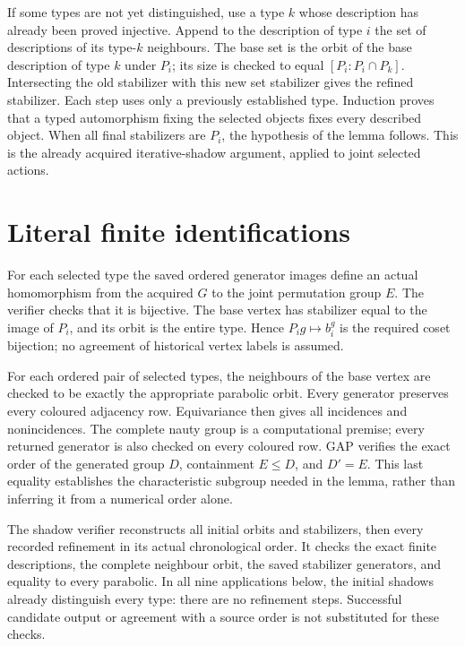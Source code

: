 \documentclass[11pt]{article}
\begin{document}
If some types are not yet distinguished, use a type $k$ whose
description has already been proved injective. Append to the description
of type $i$ the set of descriptions of its type-$k$ neighbours. The
base set is the orbit of the base description of type $k$ under $P_i$;
its size is checked to equal $[P_i:P_i\cap P_k]$. Intersecting the old
stabilizer with this new set stabilizer gives the refined stabilizer.
Each step uses only a previously established type. Induction proves
that a typed automorphism fixing the selected objects fixes every
described object. When all final stabilizers are $P_i$, the hypothesis
of the lemma follows. This is the already acquired iterative-shadow
argument, applied to joint selected actions.

\section*{Literal finite identifications}
For each selected type the saved ordered generator images define an
actual homomorphism from the acquired $G$ to the joint permutation
group $E$. The verifier checks that it is bijective. The base vertex
has stabilizer equal to the image of $P_i$, and its orbit is the entire
type. Hence $P_i g\mapsto b_i^g$ is the required coset bijection;
no agreement of historical vertex labels is assumed.

For each ordered pair of selected types, the neighbours of the base
vertex are checked to be exactly the appropriate parabolic orbit.
Every generator preserves every coloured adjacency row. Equivariance
then gives all incidences and nonincidences. The complete nauty group
is a computational premise; every returned generator is also checked
on every coloured row. GAP verifies the exact order of the generated
group $D$, containment $E\leq D$, and $D'=E$. This last equality
establishes the characteristic subgroup needed in the lemma, rather
than inferring it from a numerical order alone.

The shadow verifier reconstructs all initial orbits and stabilizers,
then every recorded refinement in its actual chronological order.
It checks the exact finite descriptions, the complete neighbour orbit,
the saved stabilizer generators, and equality to every parabolic.
In all nine applications below, the initial shadows already distinguish
every type: there are no refinement steps. Successful candidate output
or agreement with a source order is not substituted for these checks.
\end{document}
